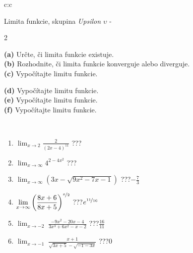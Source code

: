\documentclass[10pt]{report}
\begin{document}
\newpage
\thispagestyle{empty}
\begin{tabular}{c:c}
\begin{minipage}[c][104.5mm][t]{0.5\linewidth}
\begin{center}
\vspace{7mm}
{\huge Limita funkcie, skupina \textit{Upsilon $\upsilon$} -}\\[5mm]
\begin{minipage}{0.95\linewidth}
\begin{center}
{\small \begin{multicols}{2} \raggedright
\textbf{(a)} Určte, či limita funkcie existuje. \\[1mm]
\textbf{(b)} Rozhodnite, či limita funkcie konverguje alebo diverguje. \\[1mm]
\textbf{(c)} Vypočítajte limitu funkcie. \par \columnbreak
\textbf{(d)} Vypočítajte limitu funkcie. \\[1mm]
\textbf{(e)} Vypočítajte limitu funkcie. \\[1mm]
\textbf{(f)} Vypočítajte limitu funkcie. \\[1mm]
\end{multicols}
}
\end{center}
\end{minipage}
\\[4mm]
\begin{minipage}{0.79\linewidth}
\begin{center}
\begin{varwidth}{\linewidth}
\begin{enumerate}
\normalsize
\item $\displaystyle\lim_{x\to2}{\frac{2}{(2x-4)^{11}}}$\quad \dotfill\; ???\;\dotfill \quad {}
\item $\displaystyle\lim_{x\to\infty}{4^{2-4x^2}}$\quad \dotfill\; ???\;\dotfill \quad {}
\item $\displaystyle\lim_{x\to\infty}{\left(3x - \sqrt{9x^2-7x-1}\right)}$\quad \dotfill\; ???\;\dotfill \quad $-\frac{7}{3}$
\item $\displaystyle\lim_{x\to\infty}{\left( \frac{8x+6}{8x+5} \right)^{\nicefrac{x}{2}}}$\quad \dotfill\; ???\;\dotfill \quad $e^{\nicefrac{11}{16}}$
\item $\displaystyle\lim_{x\to -2}{\;\frac{-9x^2-20x-4}{3x^3+6x^2-x-2}}$\quad \dotfill\; ???\;\dotfill \quad $\frac{16}{11}$
\item $\displaystyle\lim_{x\to -1}{\;\frac{x+1}{\sqrt{3x+5} - \sqrt{-1-3x}}}$\quad \dotfill\; ???\;\dotfill \quad $0$

\end{enumerate}
\end{varwidth}
\end{center}
\end{minipage}
\end{center}
\end{minipage}
\end{tabular}
\end{document}
